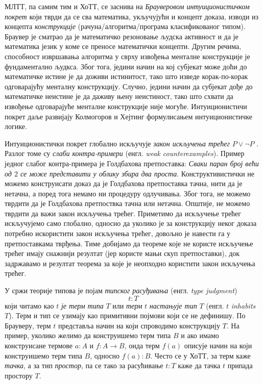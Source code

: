 \documentclass[12pt,oneside]{memoir}
\begin{document}
МЛТТ, па самим тим и ХоТТ, се заснива на \emph{Брауверовом интуиционистичком покрет} \cite{brw} који тврди да се сва математика, укључујући и концепт доказа, изводи из концепта \emph{конструкције} (рачуна/алгоритма/програма класификованог типом). Браувер је сматрао да је математичко резоновање људска активност и да је математика језик у коме се преносе математички концепти. Другим речима, способност извршавања алгоритма у сврху извођења менталне конструкције је фундаментално људкса. Због тога, једини начин на кој субјекат може доћи до математичке истине је да доживи истинитост, тако што изведе корак-по-корак одговарајућу менталну конструкцију. Случно, једини начин да субјекат дође до математичке неистине је да даживу њену неистиност, тако што схвати да извођење одговарајуће менталне конструкције није могуће. Интуиционистичи покрет даље развијају Колмогоров \cite{kol32} и Хејтинг \cite{hey} формулисањем интуиционистичке логике.

Интуиционистички покрет глобално искључује \emph{закон искључења трећег} $P \lor \neg P$ \cite{brw}. Разлог томе су \emph{слаби контра-примери} (енгл. \emph{weak counterexamples}). Пример једног слабог контра-примера је Голдбахова претпоставка: \emph{Сваки паран број већи од $2$ се може представити у облику збира два проста}.  Конструктивистички не можемо конструисати доказ да је Голдбахова претпоставка тачна, нити да је нетачна, а поред тога немамо ни процедуру одлучивања. Због тога, не можемо тврдити да је Голдбахова претпоствка тачна или нетачна. Општије, не можемо тврдити да важи закон искључења трећег. Приметимо да искључење трећег искључујемо само глобално, односно да уколико је за конструкцију неког доказа потребно искористити закон искључења трећег, довољно је навести га у претпоставкама тврђења. Тиме добијамо да теореме које не користе искључење трећег имају снажнији резултат (јер користе мањи скуп претпоставки), док задржавамо и резултат теорема за које је неопходно користити закон искључења трећег.   

У сржи теорије типова је појам \emph{типског расуђивања} (енгл. \emph{type judgment}) $$t : T$$ који читамо као $t$ \emph{је терм типа} $T$ или \emph{терм} $t$ \emph{настањује тип} $T$ (енгл. $t$ \emph{inhabits} $T$). Терм и тип се узимају као примитивни појмови који се не дефинишу. По Брауверу, терм $t$ представља начин на који спроводимо конструкцију $T$. На пример, уколико желимо да конструишемо терм типа $B$ и ако имамо конструисане термове $a : A$ и $f : A \to B$, онда терм $f(a)$ описује начин на који конструишемо терм типа $B$, односно $f(a) : B$. Често се у ХоТТ, за терм каже \emph{тачка}, а за тип \emph{простор}, па се тако за расућивање $t : T$ каже да тачка $t$ припада простору $T$.
\end{document}
